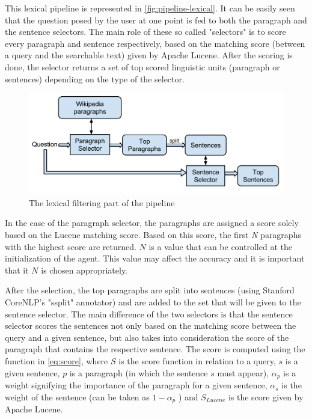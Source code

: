 This lexical pipeline is represented in \autoref{fig:pipeline-lexical}. It can be easily seen that the question posed by the user at one point is fed to both the paragraph and the sentence selectors. The main role of these so called "selectors" is to score every paragraph and sentence respectively, based on the matching score (between a query and the searchable text) given by Apache Lucene. After the scoring is done, the selector returns a set of top scored linguistic units (paragraph or sentences) depending on the type of the selector.

\begin{figure}[htb]
  \centering
  \captionsetup{justification=centering}
  \includegraphics[width=\textwidth]{src/img/pipeline-lexical.png}
  \caption{The lexical filtering part of the pipeline}
  \label{fig:pipeline-lexical}
\end{figure}

In the case of the paragraph selector, the paragraphs are assigned a score solely based on the Lucene matching score. Based on this score, the first {\em N} paragraphs with the highest score are returned. $ N $ is a value that can be controlled at the initialization of the agent. This value may affect the accuracy and it is important that it $ N $ is chosen appropriately.

After the selection, the top paragraphs are split into sentences (using Stanford CoreNLP's "ssplit" annotator) and are added to the set that will be given to the sentence selector. The main difference of the two selectors is that the sentence selector scores the sentences not only based on the matching score between the query and a given sentence, but also takes into consideration the score of the paragraph that contains the respective sentence. The score is computed using the function in \autoref{eq:score}, where $ S $ is the score function in relation to a query, $ s $ is a given sentence, $ p $ is a paragraph (in which the sentence $ s $ must appear), $ \alpha_{p} $ is a weight signifying the importance of the paragraph for a given sentence, $ \alpha_{s} $ is the weight of the sentence (can be taken as $ 1 - \alpha_{p} $ ) and $ S_{Lucene} $ is the score given by Apache Lucene.

